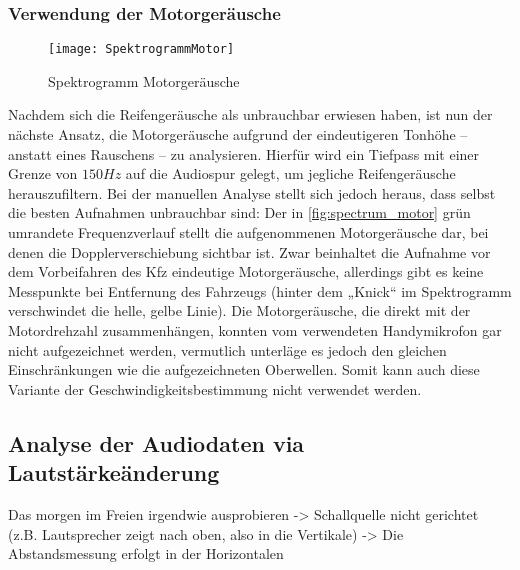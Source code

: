 \subsubsection{Verwendung der Motorgeräusche}

\begin{figure}[h]
    \centering
    \texttt{[image: SpektrogrammMotor]}
    \caption{Spektrogramm Motorgeräusche}
    \label{fig:spectrum_motor}
\end{figure}

Nachdem sich die Reifengeräusche als unbrauchbar erwiesen haben, ist nun der nächste Ansatz, die Motorgeräusche aufgrund der eindeutigeren Tonhöhe -- anstatt eines Rauschens -- zu analysieren. Hierfür wird ein Tiefpass mit einer Grenze von \(150 Hz\) auf die Audiospur gelegt, um jegliche Reifengeräusche herauszufiltern. Bei der manuellen Analyse stellt sich jedoch heraus, dass selbst die besten Aufnahmen unbrauchbar sind: Der in \autoref{fig:spectrum_motor} grün umrandete Frequenzverlauf stellt die aufgenommenen Motorgeräusche dar, bei denen die Dopplerverschiebung sichtbar ist. Zwar beinhaltet die Aufnahme vor dem Vorbeifahren des Kfz eindeutige Motorgeräusche, allerdings gibt es keine Messpunkte bei Entfernung des Fahrzeugs (hinter dem „Knick“ im Spektrogramm verschwindet die helle, gelbe Linie). Die Motorgeräusche, die direkt mit der Motordrehzahl zusammenhängen, konnten vom verwendeten Handymikrofon gar nicht aufgezeichnet werden, vermutlich unterläge es jedoch den gleichen Einschränkungen wie die aufgezeichneten Oberwellen. Somit kann auch diese Variante der Geschwindigkeitsbestimmung nicht verwendet werden.

\subsection{Analyse der Audiodaten via Lautstärkeänderung}


Das morgen im Freien irgendwie ausprobieren
-> Schallquelle nicht gerichtet (z.B. Lautsprecher zeigt nach oben, also in die Vertikale)
-> Die Abstandsmessung erfolgt in der Horizontalen